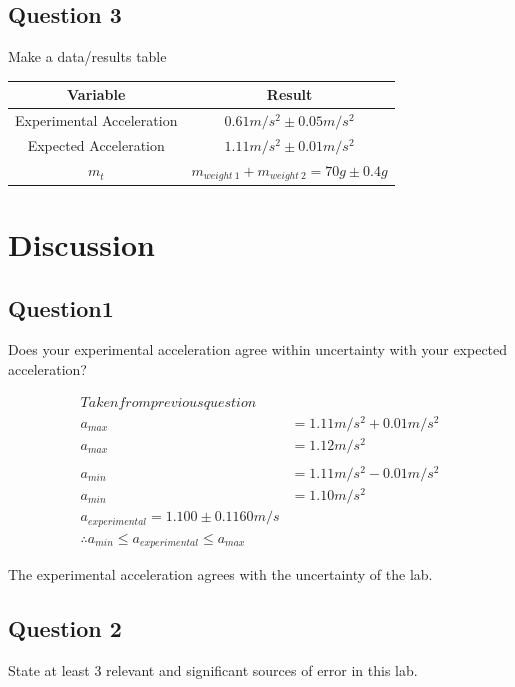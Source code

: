 \documentclass{article}
\begin{document}
\pagebreak

\subsection{Question 3}
Make a data/results table

\begin{center}
	\begin{tabular}{|c|c|}
		\hline
		Variable & Result\\
		\hline \hline
		Experimental Acceleration & $0.61m/s^2\pm0.05m/s^2$\\
		\hline
		Expected Acceleration & $1.11m/s^2 \pm 0.01m/s^2$\\
		\hline
		$m_{t}$ & $m_{weight\ 1} + m_{weight\ 2} = 70g\pm0.4g$\\
		\hline
	\end{tabular}
\end{center}


\section{Discussion}

\subsection{Question1}
Does your experimental acceleration agree within uncertainty with your expected acceleration?

\begin{align*}
Taken from previous question\\
a_{max}		& = 1.11m/s^2 + 0.01m/s^2\\
a_{max} 	& = 1.12m/s^2\\
\\
a_{min}		& = 1.11m/s^2 - 0.01m/s^2\\
a_{min}		& = 1.10m/s^2
\\
a_{experimental} = 1.100\pm0.1160m/s\\
\therefore a_{min}\leq a_{experimental}\leq  a_{max}
\end{align*}

The experimental acceleration agrees with the uncertainty of the lab.

\pagebreak

\subsection{Question 2}
State at least 3 relevant and significant sources of error in this lab.
\end{document}
